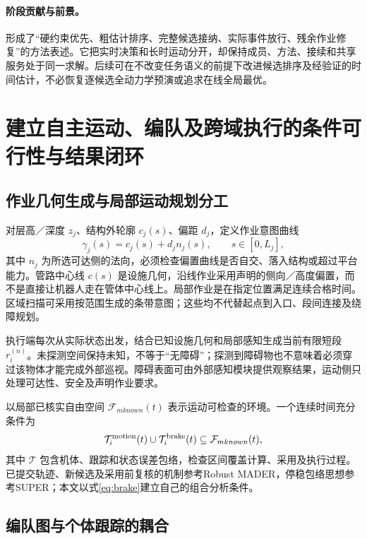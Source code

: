 \documentclass[UTF8,fontset=fandol,a4paper,11pt]{ctexart}
\begin{document}
\paragraph{阶段贡献与前景。}
形成了“硬约束优先、粗估计排序、完整候选接纳、实际事件放行、残余作业修复”的方法表述。它把实时决策和长时运动分开，却保持成员、方法、接续和共享服务处于同一求解。后续可在不改变任务语义的前提下改进候选排序及经验证的时间估计，不必恢复逐候选全动力学预演或追求在线全局最优。

\section{建立自主运动、编队及跨域执行的条件可行性与结果闭环}
\subsection{作业几何生成与局部运动规划分工}

对层高／深度 $z_j$、结构外轮廓 $c_j(s)$、偏距 $d_j$，定义作业意图曲线
\begin{equation}
 \gamma_j(s)=c_j(s)+d_j n_j(s),\qquad s\in[0,L_j],
 \label{eq:contour}
\end{equation}
其中 $n_j$ 为所选可达侧的法向，必须检查偏置曲线是否自交、落入结构或超过平台能力。管路中心线 $c(s)$ 是设施几何，沿线作业采用声明的侧向／高度偏置，而不是直接让机器人走在管体中心线上。局部作业是在指定位置满足连续合格时间。区域扫描可采用按范围生成的条带意图；这些均不代替起点到入口、段间连接及绕障规划。

执行端每次从实际状态出发，结合已知设施几何和局部感知生成当前有限短段 $r_i^{(n)}$。未探测空间保持未知，不等于“无障碍”；探测到障碍物也不意味着必须穿过该物体才能完成外部巡视。障碍表面可由外部感知模块提供观察结果，运动侧只处理可达性、安全及声明作业要求。

以局部已核实自由空间 $\mathcal F_{
m known}(t)$ 表示运动可检查的环境。一个连续时间充分条件为
\begin{equation}
 \mathcal T_i^{\rm motion}(t)\cup\mathcal T_i^{\rm brake}(t)
       \subseteq\mathcal F_{
m known}(t),
 \label{eq:brake}
\end{equation}
其中 $\mathcal T$ 包含机体、跟踪和状态误差包络，检查区间覆盖计算、采用及执行过程。已提交轨迹、新候选及采用前复核的机制参考Robust MADER\cite{rmader}，停稳包络思想参考SUPER\cite{super}；本文以式\eqref{eq:brake}建立自己的组合分析条件。

\subsection{编队图与个体跟踪的耦合}
\end{document}
